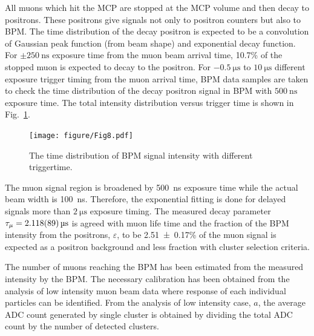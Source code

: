 \documentclass[preprint,3p,twocolumn]{elsarticle}
\begin{document}
All muons which hit the MCP are stopped at the MCP volume and then decay to positrons.
These positrons give signals not only to positron counters but also to BPM.
The time distribution of the decay positron is expected to be a convolution of Gaussian peak function (from beam shape) and exponential decay function.
For $\pm\SI{250}{\nano\s}$ exposure time from the muon beam arrival time, 10.7\% of the stopped muon is expected to decay to the positron.
For $\SI{-0.5}{\micro\s}$ to $\SI{10}{\micro\s}$ different exposure trigger timing from the muon arrival time, BPM data samples are taken to check the time distribution of the decay positron signal in BPM with $\SI{500}{\nano\s}$ exposure time.
The total intensity distribution versus trigger time is shown in Fig.~\ref{fig:time_distribution}. 

\begin{figure}[htb]
	\vspace{-0.1cm}
	\begin{minipage}[t]{60mm}
		\texttt{[image: figure/Fig8.pdf]}
	\end{minipage}
	\vspace{-0.2cm}
	\caption{The time distribution of BPM signal intensity with different triggertime.}
	\label{fig:time_distribution}
	\vspace{-0.1cm}
\end{figure}
The muon signal region is broadened by \SI{500}{\nano\s} exposure time while the actual beam width is \SI{100}{\nano\s}. Therefore, the exponential fitting is done for delayed signals more than $\SI{2}{\micro\s}$ exposure timing. The measured decay parameter $\tau_{\mu}=\SI{2.118 \pm 0.089}{\micro\s}$ is agreed with muon life time and the fraction of the BPM intensity from the positrons, $\varepsilon$, to be \num{2.51 \pm 0.17}\% of the muon signal is expected as a positron background and less fraction with cluster selection criteria. 

The number of muons reaching the BPM has been estimated from the measured intensity by the BPM. The necessary calibration has been obtained from the analysis of low intensity muon beam data where response of each individual particles can be identified. From the analysis of low intensity case, $a$, the average ADC count generated by single cluster is obtained by dividing the total ADC count by the number of detected clusters.
\end{document}
